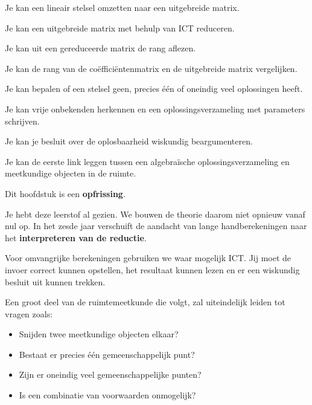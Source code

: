 \documentclass{ximera}
\begin{document}
\begin{leerdoelen}
  \item Je kan een lineair stelsel omzetten naar een uitgebreide matrix.
  \item Je kan een uitgebreide matrix met behulp van ICT reduceren.
  \item Je kan uit een gereduceerde matrix de rang aflezen.
  \item Je kan de rang van de coëfficiëntenmatrix en de uitgebreide matrix vergelijken.
  \item Je kan bepalen of een stelsel geen, precies één of oneindig veel oplossingen heeft.
  \item Je kan vrije onbekenden herkennen en een oplossingsverzameling met parameters schrijven.
  \item Je kan je besluit over de oplosbaarheid wiskundig beargumenteren.
  \item Je kan de eerste link leggen tussen een algebraïsche oplossingsverzameling
        en meetkundige objecten in de ruimte.
\end{leerdoelen}


\begin{opmerking}
Dit hoofdstuk is een \textbf{opfrissing}.

Je hebt deze leerstof al gezien. We bouwen de theorie daarom niet opnieuw
vanaf nul op. In het zesde jaar verschuift de aandacht van lange
handberekeningen naar het \textbf{interpreteren van de reductie}.

Voor omvangrijke berekeningen gebruiken we waar mogelijk ICT.
Jij moet de invoer correct kunnen opstellen, het resultaat kunnen lezen
en er een wiskundig besluit uit kunnen trekken.
\end{opmerking}




Een groot deel van de ruimtemeetkunde die volgt, zal uiteindelijk leiden tot
vragen zoals:

\begin{itemize}
    \item Snijden twee meetkundige objecten elkaar?
    \item Bestaat er precies één gemeenschappelijk punt?
    \item Zijn er oneindig veel gemeenschappelijke punten?
    \item Is een combinatie van voorwaarden onmogelijk?
\end{itemize}
\end{document}
